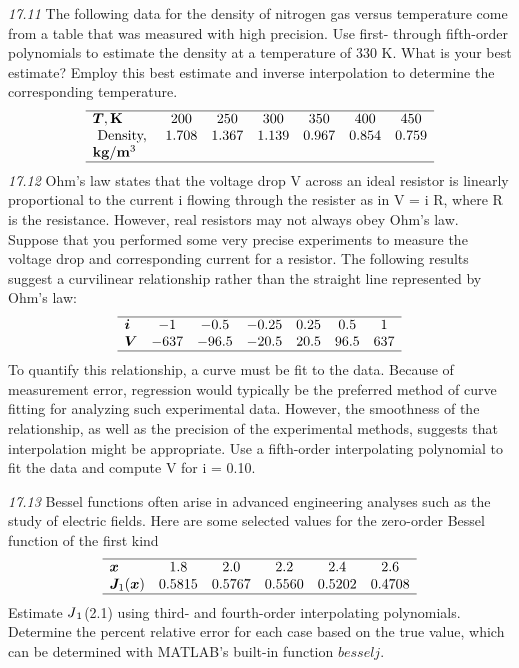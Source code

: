 \documentclass[../main.tex]{subfiles}
\begin{document}
\begin{multicols}{2}
    \noindent\textit{17.11} The following data for the density of nitrogen gas versus temperature come from a table that was measured with
    high precision. Use first- through fifth-order polynomials to
    estimate the density at a temperature of 330 K. What is your
    best estimate? Employ this best estimate and inverse interpolation to determine the corresponding temperature.
    $$
    \begin{array}{lcccccc}
    \hline \boldsymbol{T}, \mathbf{K} & 200 & 250 & 300 & 350 & 400 & 450 \\
    \text { Density, } & 1.708 & 1.367 & 1.139 & 0.967 & 0.854 & 0.759 \\
    \mathbf{k g} / \mathbf{m}^{3} & & & & & & \\
    \hline
    \end{array}
    $$
    \noindent\textit{17.12} Ohm's law states that the voltage drop V across an
    ideal resistor is linearly proportional to the current i flowing
    through the resister as in V = i R, where R is the resistance.
    However, real resistors may not always obey Ohm's law.
    Suppose that you performed some very precise experiments
    to measure the voltage drop and corresponding current for a
    resistor. The following results suggest a curvilinear relationship rather than the straight line represented by Ohm's law:
    $$
    \begin{array}{lcccccc}
    \hline \boldsymbol{i} & -1 & -0.5 & -0.25 & 0.25 & 0.5 & 1 \\
    \boldsymbol{V} & -637 & -96.5 & -20.5 & 20.5 & 96.5 & 637 \\
    \hline
    \end{array}
    $$
    To quantify this relationship, a curve must be fit to the data. Because of measurement error, regression would typically be the
preferred method of curve fitting for analyzing such experimental data. However, the smoothness of the relationship, as
well as the precision of the experimental methods, suggests
that interpolation might be appropriate. Use a fifth-order interpolating polynomial to fit the data and compute V for i = 0.10.

\noindent\textit{17.13} Bessel functions often arise in advanced engineering
analyses such as the study of electric fields. Here are some
selected values for the zero-order Bessel function of the first
kind
$$
\begin{array}{lccccc}
\hline \boldsymbol{x} & 1.8 & 2.0 & 2.2 & 2.4 & 2.6 \\
\boldsymbol{J}_{1}(\boldsymbol{x}) & 0.5815 & 0.5767 & 0.5560 & 0.5202 & 0.4708 \\
\hline
\end{array}
$$
Estimate $J\textsubscript{1}$(2.1) using third- and fourth-order interpolating
polynomials. Determine the percent relative error for each
case based on the true value, which can be determined with
MATLAB's built-in function $besselj$.


\end{multicols}
\end{document}
